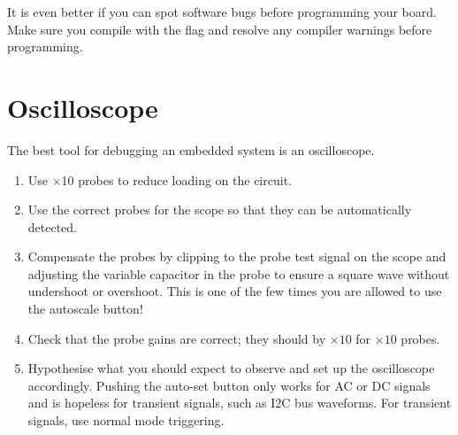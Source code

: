 It is even better if you can spot software bugs before programming
your board. Make sure you compile with the  flag and
resolve any compiler warnings before programming.

\section{Oscilloscope}
\label{oscilloscope}

The best tool for debugging an embedded system is an oscilloscope.

\begin{enumerate}
\item  Use $\times$10 probes to reduce loading on the circuit.

\item Use the correct probes for the scope so that they can be automatically
  detected.

\item Compensate the probes by clipping to the probe test signal on
  the scope and adjusting the variable capacitor in the probe to
  ensure a square wave without undershoot or overshoot. This is one of
  the few times you are allowed to use the autoscale button!

\item Check that the probe gains are correct; they should by $\times
  10$ for $\times 10$ probes.

\item Hypothesise what you should expect to observe and set up the
  oscilloscope accordingly.  Pushing the auto-set button only works
  for AC or DC signals and is hopeless for transient signals, such as
  I2C bus waveforms.  For transient signals, use normal mode triggering.

\end{enumerate}

